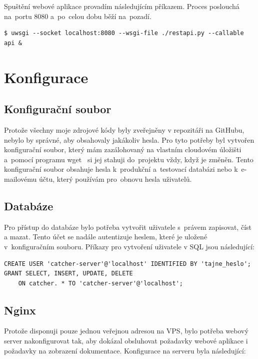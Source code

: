 Spuštění webové aplikace provadím následujícím příkazem. Proces poslouchá na~portu 8080 a~po~celou dobu běží na~pozadí.

\begingroup
\fontsize{9.5pt}{11pt}\selectfont
\begin{verbatim}
$ uwsgi --socket localhost:8080 --wsgi-file ./restapi.py --callable api &
\end{verbatim}
\endgroup

\section{Konfigurace}

\subsection*{Konfigurační soubor}

Protože všechny moje zdrojové kódy byly zveřejněny v repozitáři na Git\-Hubu, nebylo by správné, aby obsahovaly jakákoliv hesla.
Pro tyto potřeby byl vytvořen konfigurační soubor, který mám zazálohovaný na vlastním cloudovém úložišti
a~pomocí programu wget~\cite{wget} si jej stahuji do~projektu vždy, když je změněn.
Tento konfigurační soubor obsahuje hesla k~produkční a~testovací databázi
nebo k~e-mailovému účtu, který používám pro~obnovu hesla uživatelů.

\subsection*{Databáze}

Pro přístup do databáze bylo potřeba vytvořit uživatele s~právem zapisovat, číst a mazat.
Tento účet se nadále autentizuje heslem, které je uložené v~konfiguračním souboru.
Příkazy pro vytvoření uživatele v SQL jsou následující:

\begingroup
\fontsize{9.5pt}{11pt}\selectfont
\begin{verbatim}
CREATE USER 'catcher-server'@'localhost' IDENTIFIED BY 'tajne_heslo';
GRANT SELECT, INSERT, UPDATE, DELETE
    ON catcher. * TO 'catcher-server'@'localhost';
\end{verbatim}
\endgroup

\subsection*{Nginx}

Protože disponuji pouze jednou veřejnou adresou na VPS, bylo potřeba webový server nakonfigurovat tak,
aby dokázal obsluhovat požadavky webové aplikace i požadavky
na zobrazení dokumentace. Konfigurace na serveru byla následující:

